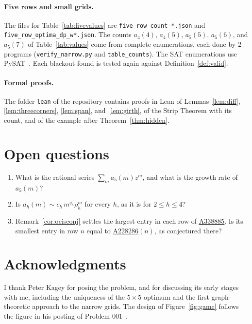 \documentclass[12pt]{article}
\theoremstyle{plain}
\theoremstyle{definition}
\theoremstyle{remark}
\newcommand{\seqnum}[1]{\href{https://oeis.org/#1}{\rm \underline{#1}}}
\begin{document}
\paragraph{Five rows and small grids.} The files for Table~\ref{tab:fivevalues}
are \nolinkurl{five_row_count_*.json} and \nolinkurl{five_row_optima_dp_w*.json}.
The counts $a_4(4)$, $a_4(5)$, $a_5(5)$, $a_5(6)$, and $a_5(7)$ of
Table~\ref{tab:values} come from complete enumerations, each done by $2$
programs (\nolinkurl{verify_narrow.py} and \nolinkurl{table_counts}). The SAT
enumerations use PySAT~\cite{pysat2018}. Each blackout found is tested again
against Definition~\ref{def:valid}.

\paragraph{Formal proofs.} The folder \nolinkurl{lean} of the repository
contains proofs in Lean of Lemmas~\ref{lem:diff}, \ref{lem:threecorners},
\ref{lem:span}, and~\ref{lem:girth}, of the Strip Theorem with its count, and of
the example after Theorem~\ref{thm:hidden}.
\section{Open questions}\label{sec:open}

\begin{enumerate}[(1),leftmargin=*]
\item What is the rational series $\sum_m a_5(m)z^m$, and what is the growth rate
of $a_5(m)$?
\item Is $a_h(m)\sim c_h\,m^{q_h}\rho_h^m$ for every $h$, as it is for $2\le h\le4$?
\item Remark~\ref{cor:oeisconj} settles the largest entry in each row of
\seqnum{A338885}. Is its smallest entry in row $n$ equal to
\seqnum{A228286}$(n)$, as conjectured there?
\end{enumerate}

\section{Acknowledgments}\label{sec:ack}

I thank Peter Kagey for posing the problem, and for discussing its early stages
with me, including the uniqueness of the $5\times5$ optimum and the first
graph-theoretic approach to the narrow grids. The design of Figure~\ref{fig:game} follows the figure in his posting of
Problem 001~\cite{kagey001}.
\end{document}
